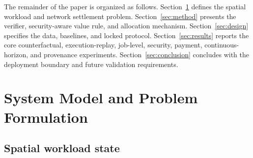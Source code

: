 \documentclass[10pt,journal]{IEEEtran}
\begin{document}
The remainder of the paper is organized as follows. Section~\ref{sec:model}
defines the spatial workload and network settlement problem. Section~\ref{sec:method}
presents the verifier, security-aware value rule, and allocation mechanism.
Section~\ref{sec:design} specifies the data, baselines, and locked protocol.
Section~\ref{sec:results} reports the core counterfactual, execution-replay,
job-level, security, payment, continuous-horizon, and provenance experiments.
Section~\ref{sec:conclusion} concludes with the deployment boundary and future
validation requirements.

\section{System Model and Problem Formulation}\label{sec:model}

\subsection{Spatial workload state}
\end{document}
